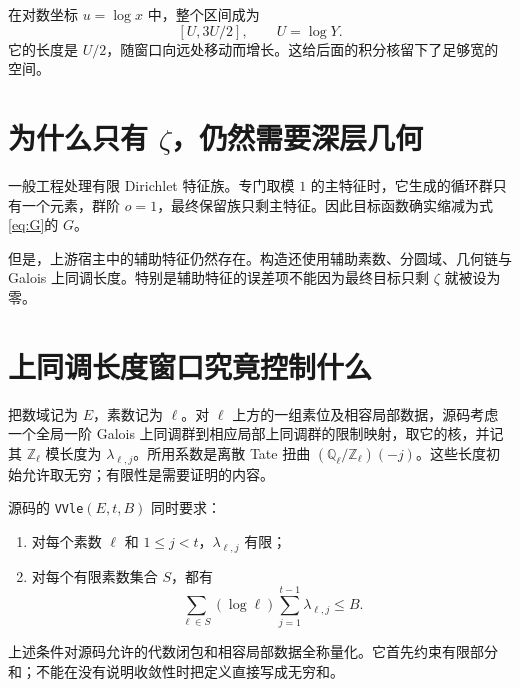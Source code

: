 \documentclass[UTF8,fontset=fandol,a4paper,openany,oneside]{ctexbook}
\theoremstyle{definition}
\theoremstyle{remark}
\begin{document}
在对数坐标 $u=\log x$ 中，整个区间成为
\[
[U,3U/2],\qquad U=\log Y.
\]
它的长度是 $U/2$，随窗口向远处移动而增长。这给后面的积分核留下了足够宽的空间。

\begin{center}
\end{center}

\section{为什么只有 $\zeta$，仍然需要深层几何}
一般工程处理有限 Dirichlet 特征族。专门取模 $1$ 的主特征时，它生成的循环群只有一个元素，群阶 $o=1$，最终保留族只剩主特征。因此目标函数确实缩减为式\eqref{eq:G}的 $G$。

但是，上游宿主中的辅助特征仍然存在。构造还使用辅助素数、分圆域、几何链与 Galois 上同调长度。特别是辅助特征的误差项不能因为最终目标只剩 $\zeta$ 就被设为零。


\section{上同调长度窗口究竟控制什么}
\label{sec:arith-length}
把数域记为 $E$，素数记为 $\ell$。对 $\ell$ 上方的一组素位及相容局部数据，源码考虑一个全局一阶 Galois 上同调群到相应局部上同调群的限制映射，取它的核，并记其 $\mathbb Z_\ell$ 模长度为 $\lambda_{\ell,j}$。所用系数是离散 Tate 扭曲 $(\mathbb Q_\ell/\mathbb Z_\ell)(-j)$。这些长度初始允许取无穷；有限性是需要证明的内容。

源码的 \texttt{VVle}$(E,t,B)$ 同时要求：
\begin{enumerate}
\item 对每个素数 $\ell$ 和 $1\le j<t$，$\lambda_{\ell,j}$ 有限；
\item 对每个有限素数集合 $S$，都有
\begin{equation}
\sum_{\ell\in S}(\log\ell)\sum_{j=1}^{t-1}\lambda_{\ell,j}\le B.
\label{eq:arith-vv-partial}
\end{equation}
\end{enumerate}
上述条件对源码允许的代数闭包和相容局部数据全称量化。它首先约束有限部分和；不能在没有说明收敛性时把定义直接写成无穷和。
\end{document}
